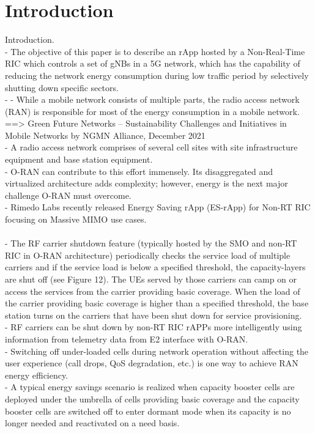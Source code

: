 \documentclass[conference]{IEEEtran}
\begin{document}
\section{Introduction}
Introduction.
\\
- The objective of this paper is to describe an rApp hosted by a Non-Real-Time RIC which controls a set of gNBs in a 5G network, which has the capability of reducing the network energy consumption during low traffic period by selectively shutting down specific sectors. \\
- - While a mobile network consists of multiple parts, the radio access network (RAN) is responsible for most of the energy consumption in a mobile network. ==> 
Green Future Networks – Sustainability Challenges and Initiatives in Mobile Networks by NGMN Alliance,
December 2021
\href{https://www.ngmn.org/wp-content/uploads/210719_NGMN_GFN_Sustainability-Challenges-andInitiatives_v1.0.pdf} \\
- A radio access network comprises of several cell sites with site infrastructure equipment and base station equipment. \\
- O-RAN can contribute to this effort immensely. Its disaggregated and virtualized architecture adds complexity; however, energy is the next major challenge O-RAN must overcome. \\
- Rimedo Labs recently released Energy Saving rApp (ES-rApp) for Non-RT RIC focusing on Massive MIMO use cases. \\ 
\\
- The RF carrier shutdown feature (typically hosted by the SMO and non-RT RIC in O-RAN architecture)
periodically checks the service load of multiple carriers and if the service load is below a specified threshold, the capacity-layers are shut off (see Figure 12). The UEs served by those carriers can camp on or access the services from the carrier providing basic coverage. When the load of the carrier providing basic coverage is higher than a specified threshold, the base station turns on the carriers that have been shut down for service provisioning. \\
- RF carriers can be shut down by non-RT RIC rAPPs more intelligently using information from telemetry data from E2 interface with O-RAN.\\
- Switching off under-loaded cells during network operation without affecting the user experience (call drops, QoS degradation, etc.) is one way to achieve RAN energy efficiency. \\
- A typical energy savings scenario is realized when capacity booster cells are deployed under the umbrella of cells providing basic coverage and the capacity booster cells are switched off to enter dormant mode when its capacity is no longer needed and reactivated on a need basis. \\
\end{document}
